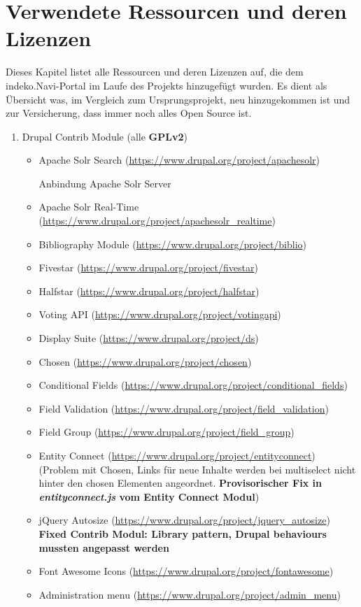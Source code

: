 \newpage
\section{Verwendete Ressourcen und deren Lizenzen}\label{sub:license}
Dieses Kapitel listet alle Ressourcen und deren Lizenzen auf, die dem \acrshort{indeko}.Navi-Portal im Laufe des Projekts hinzugefügt wurden. Es dient als Übersicht was, im Vergleich zum Ursprungsprojekt, neu hinzugekommen ist und zur Versicherung, dass immer noch alles Open Source ist.

\begin{enumerate}[parsep=0pt, itemsep=5.0pt plus 2.0pt minus 1.0pt, leftmargin=*]
	\item Drupal Contrib Module (alle \textbf{GPLv2})
	\begin{itemize}
		\item Apache Solr Search (\url{https://www.drupal.org/project/apachesolr})
		
		Anbindung Apache Solr Server
		
		\item Apache Solr Real-Time (\url{https://www.drupal.org/project/apachesolr_realtime})
		\item Bibliography Module (\url{https://www.drupal.org/project/biblio})
		\item Fivestar (\url{https://www.drupal.org/project/fivestar})
		\item Halfstar (\url{https://www.drupal.org/project/halfstar})
		\item Voting API (\url{https://www.drupal.org/project/votingapi})
		\item Display Suite (\url{https://www.drupal.org/project/ds})
		\item Chosen (\url{https://www.drupal.org/project/chosen})
		\item Conditional Fields (\url{https://www.drupal.org/project/conditional_fields})
		\item Field Validation (\url{https://www.drupal.org/project/field_validation})
		\item Field Group (\url{https://www.drupal.org/project/field_group})
		\item Entity Connect (\url{https://www.drupal.org/project/entityconnect}) (Problem mit Chosen, Links für neue Inhalte werden bei multiselect nicht hinter den chosen Elementen angeordnet. \textbf{Provisorischer Fix in \textit{entityconnect.js} vom Entity Connect Modul})
		\item jQuery Autosize (\url{https://www.drupal.org/project/jquery_autosize}) \textbf{Fixed Contrib Modul: Library pattern, Drupal behaviours mussten angepasst werden}
		\item Font Awesome Icons (\url{https://www.drupal.org/project/fontawesome})	
		\item Administration menu (\url{https://www.drupal.org/project/admin_menu})
	\end{itemize}


\end{enumerate}
